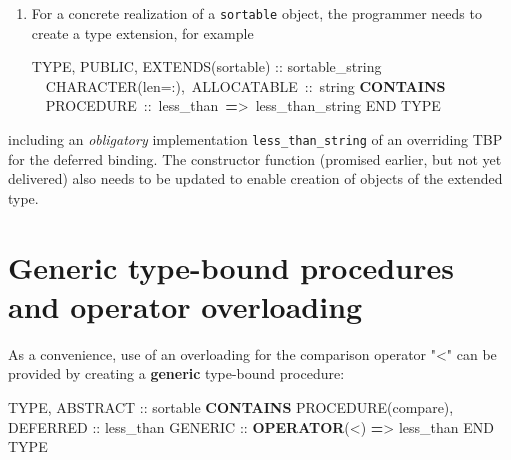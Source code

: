 \documentclass[]{scrartcl}
\newenvironment{Shaded}{}{}
\newcommand{\DataTypeTok}[1]{\textcolor[rgb]{0.56,0.13,0.00}{#1}}
\newcommand{\KeywordTok}[1]{\textcolor[rgb]{0.00,0.44,0.13}{\textbf{#1}}}
\newcommand{\NormalTok}[1]{#1}
\newcommand{\OperatorTok}[1]{\textcolor[rgb]{0.40,0.40,0.40}{#1}}
\begin{document}
\begin{enumerate}
\def\labelenumi{\arabic{enumi}.}
\setcounter{enumi}{1}
\item
  For a concrete realization of a \texttt{sortable} object, the
  programmer needs to create a type extension, for example

\begin{Shaded}
\begin{Highlighting}[]
\DataTypeTok{TYPE}\NormalTok{, }\DataTypeTok{PUBLIC}\NormalTok{, }\DataTypeTok{EXTENDS(sortable)} \DataTypeTok{::}\NormalTok{ sortable\_string}
   \DataTypeTok{CHARACTER(len=:)}\NormalTok{, ALLOCATABLE }\DataTypeTok{::}\NormalTok{ string}
\KeywordTok{CONTAINS}
   \DataTypeTok{PROCEDURE} \DataTypeTok{::}\NormalTok{ less\_than }\KeywordTok{=}\OperatorTok{\textgreater{}}\NormalTok{ less\_than\_string}
\DataTypeTok{END TYPE}
\end{Highlighting}
\end{Shaded}
\end{enumerate}

including an \emph{obligatory} implementation
\texttt{less\_than\_string} of an overriding TBP for the deferred
binding. The constructor function (promised earlier, but not yet
delivered) also needs to be updated to enable creation of objects of the
extended type.

\section{Generic type-bound procedures and operator
overloading}\label{generic-type-bound-procedures-and-operator-overloading}

As a convenience, use of an overloading for the comparison operator
"\textless" can be provided by creating a \textbf{generic} type-bound
procedure:

\begin{Shaded}
\begin{Highlighting}[]
\DataTypeTok{TYPE}\NormalTok{, }\DataTypeTok{ABSTRACT} \DataTypeTok{::}\NormalTok{ sortable}
\KeywordTok{CONTAINS}
   \DataTypeTok{PROCEDURE(compare)}\NormalTok{, }\DataTypeTok{DEFERRED} \DataTypeTok{::}\NormalTok{ less\_than}
   \DataTypeTok{GENERIC} \DataTypeTok{::} \KeywordTok{OPERATOR}\NormalTok{(}\OperatorTok{\textless{}}\NormalTok{) }\KeywordTok{=}\OperatorTok{\textgreater{}}\NormalTok{ less\_than}
\DataTypeTok{END TYPE}
\end{Highlighting}
\end{Shaded}
\end{document}
